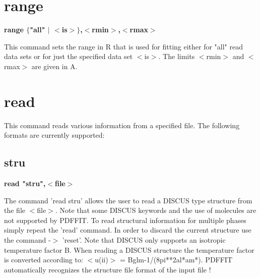 \section{range}
{\bf range $ \{$"all" $| $ $ <$is$> $$\} $,$ <$rmin$> $,$ <$rmax$> $ \par }
\par
\vspace{3pt}
This command sets the range in R that is used for fitting 
either for "all" read data sets or for just the specified 
data set $ <$is$> $. The limits $ <$rmin$> $ and $ <$rmax$> $ are given in 
A. 
\section{read}
This command reads various information from a specified file. 
The following formats are currently supported: 
\par
\subsection*{stru}
{\bf read "stru",$ <$file$> $ \par }
\par
\vspace{3pt}
The command 'read stru' allows the user to read a DISCUS 
type structure from the file $ <$file$> $. Note that some DISCUS 
keywords and the use of molecules are not supported by 
PDFFIT. To read structural information for multiple phases 
simply repeat the 'read' command. In order to discard 
the current structure use the command -$> $ 'reset'. Note that 
DISCUS only supports an isotropic temperature factor B. 
When reading a DISCUS structure the temperature factor is 
converted according to: $ <$u(ii)$> $ = Bglm-1/(8pi**2al*am*). 
PDFFIT automatically recognizes the structure file format 
of the input file ! 
